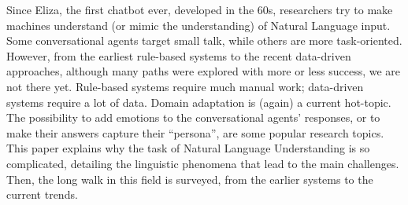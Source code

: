 Since Eliza, the first chatbot ever, developed in the 60s, researchers
try to make machines understand (or mimic the understanding) of
Natural Language input. Some conversational agents target small talk,
while others are more task-oriented. However, from the earliest
rule-based systems to the recent data-driven approaches, although many
paths were explored with more or less success, we are not there
yet. Rule-based systems require much manual work; data-driven systems
require a lot of data. Domain adaptation is (again) a current
hot-topic. The possibility to add emotions to the conversational
agents' responses, or to make their answers capture their ``persona'',
are some popular research topics.  This paper explains why the task of
Natural Language Understanding is so complicated, detailing the
linguistic phenomena that lead to the main challenges. Then, the long
walk in this field is surveyed, from the earlier systems to the
current trends.
